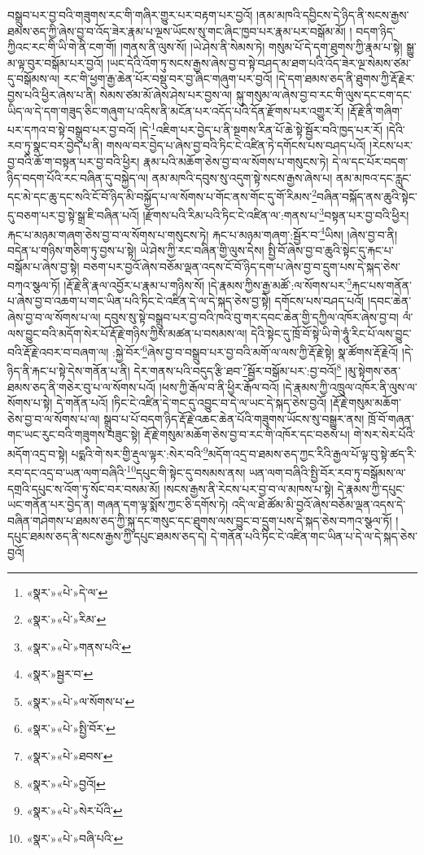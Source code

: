 བསྒྲུབ་པར་བྱ་བའི་གཟུགས་རང་གི་གཞིར་གྱུར་པར་བརྟག་པར་བྱའོ། །ནམ་མཁའི་དབྱིངས་དེ་ཉིད་ནི་སངས་རྒྱས་ཐམས་ཅད་ཀྱི་ཞེས་བྱ་བ་འོད་ཟེར་རྣམ་པ་ལྔས་ཡོངས་སུ་གང་ཞིང་ཁྱབ་པར་རྣམ་པར་བསྒོམ་མོ། །
བདག་ཉིད་ཀྱིའང་རང་གི་ཡི་གེ་ནི་ངག་གོ། །གནས་ནི་ལུས་སོ། །ཡེ་ཤེས་ནི་སེམས་ཏེ། གསུམ་པོ་དེ་དག་ཐུགས་ཀྱི་རྣམ་པ་སྟེ། སྒྱུ་མ་ལྟ་བུར་བསྒོམ་པར་བྱའོ། །ཡང་དེའི་འོག་ཏུ་སངས་རྒྱས་ཞེས་བྱ་བ་སྟེ་བཤད་མ་ཐག་པའི་འོད་ཟེར་ལྔ་སེམས་ཙམ་དུ་བསྒོམས་ལ། རང་གི་ཕྱག་རྒྱ་ཆེན་པོར་བསྡུ་བར་བྱ་ཞིང་གཞུག་པར་བྱའོ། །དེ་དག་ཐམས་ཅད་ནི་ཐུགས་ཀྱི་རྡོ་རྗེར་བྱས་པའི་ཕྱིར་ཞེས་པ་ནི། སེམས་ཙམ་མོ་ཞེས་ཤེས་པར་བྱས་ལ། སྐུ་གསུམ་ལ་ཞེས་བྱ་བ་རང་གི་ལུས་དང་ངག་དང་ཡིད་ལ་དེ་དག་གཟུད་ཅིང་གཞུག་པ་འདིས་ནི་མངོན་པར་འདོད་པའི་དོན་རྫོགས་པར་འགྱུར་རོ། །རྡོ་རྗེ་ནི་གཞིག་པར་དཀའ་བ་སྟེ་བསྒྲུབ་པར་བྱ་བའོ། །དེ་\footnote{«སྣར་»«པེ་»དེ་ལ་}འཇིག་པར་བྱེད་པ་ནི་སྔགས་རིན་པོ་ཆེ་སྟེ་སྦྱོར་བའི་ཁྱད་པར་རོ། །དེའི་རབ་ཏུ་སྣང་བར་བྱེད་པ་ནི། གསལ་བར་བྱེད་པ་ཞེས་བྱ་བའི་ཏིང་ངེ་འཛིན་ཏེ་དགོངས་པས་བཤད་པའོ། །རེངས་པར་བྱ་བའི་ཆོ་ག་བསྟན་པར་བྱ་བའི་ཕྱིར། རྣམ་པའི་མཆོག་ཅེས་བྱ་བ་ལ་སོགས་པ་གསུངས་ཏེ། དེ་ལ་དང་པོར་བདག་ཉིད་བདག་པོའི་རང་བཞིན་དུ་བསྐྱེད་ལ། ནམ་མཁའི་དབུས་སུ་འདུག་སྟེ་སངས་རྒྱས་ཞེས་པ། ནམ་མཁའ་དང་རླུང་དང་མེ་དང་ཆུ་དང་སའི་ངོ་བོ་ཉིད་མི་བསྐྱོད་པ་ལ་སོགས་པ་གོང་ནས་གོང་དུ་གོ་རིམས་\footnote{«སྣར་»«པེ་»རིམ་}བཞིན་བསྐོད་ནས་ཆུའི་སྟེང་དུ་བཅག་པར་བྱ་སྟེ་སྒྲ་ཇི་བཞིན་པའོ། །རྫོགས་པའི་རིམ་པའི་ཏིང་ངེ་འཛིན་ལ་:གནས་པ་\footnote{«སྣར་»«པེ་»གནས་པའི་}བསྟན་པར་བྱ་བའི་ཕྱིར། རྐང་པ་མཉམ་གཞག་ཅེས་བྱ་བ་ལ་སོགས་པ་གསུངས་ཏེ། རྐང་པ་མཉམ་གཞག་:སྦྱོར་བ་\footnote{«སྣར་»སྦྱར་བ་}ཡིས། །ཞེས་བྱ་བ་ནི། བདེན་པ་གཉིས་གཅིག་ཏུ་བྱས་པ་སྟེ། ཡེ་ཤེས་ཀྱི་རང་བཞིན་གྱི་ལུས་དེས། སྤྱི་བོ་ཞེས་བྱ་བ་ཆུའི་སྟེང་དུ་རྐང་པ་བསྒོམ་པ་ཞེས་བྱ་སྟེ། བཅག་པར་བྱའོ་ཞེས་བཅོམ་ལྡན་འདས་ངོ་བོ་ཉིད་དག་པ་ཞེས་བྱ་བ་དྲུག་པས་དེ་སྐད་ཅེས་བཀའ་སྩལ་ཏོ། །རྡོ་རྗེ་ནི་རྣལ་འབྱོར་པ་རྣམ་པ་གཉིས་སོ། །དེ་རྣམས་ཀྱིས་རྒྱ་མཚོ་:ལ་སོགས་པར་\footnote{«སྣར་»«པེ་»ལ་སོགས་པ་}རྐང་པས་གནོན་པ་ཞེས་བྱ་བ་འཆག་པ་གང་ཡིན་པའི་ཏིང་ངེ་འཛིན་དེ་ལ་དེ་སྐད་ཅེས་བྱ་སྟེ། དགོངས་པས་བཤད་པའོ། །དབང་ཆེན་ཞེས་བྱ་བ་ལ་སོགས་པ་ལ། དབུས་སུ་སྟེ་བསྒྲུབ་པར་བྱ་བའི་ཁའི་བུ་གར་དབང་ཆེན་གྱི་དཀྱིལ་འཁོར་ཞེས་བྱ་བ། ལཾ་ལས་བྱུང་བའི་མདོག་སེར་པོ་རྡོ་རྗེ་གཉིས་ཀྱིས་མཚན་པ་བསམས་ལ། དེའི་སྟེང་དུ་ཁྲོ་བོ་སྟེ་ཡི་གེ་ཧཱུཾ་རིང་པོ་ལས་བྱུང་བའི་རྡོ་རྗེ་འབར་བ་བཞག་ལ། :སྐྱེ་བོར་\footnote{«སྣར་»«པེ་»སྤྱི་བོར་}ཞེས་བྱ་བ་བསྒྲུབ་པར་བྱ་བའི་མགོ་ལ་ལས་ཀྱི་རྡོ་རྗེ་སྟེ། སྣ་ཚོགས་རྡོ་རྗེའོ། །དེ་ཉིད་ནི་རྐང་པ་སྟེ་དེས་གནོན་པ་ནི། དེར་གནས་པའི་བདུད་རྩི་ཐབ་\footnote{«སྣར་»«པེ་»ཐབས་}སྦྱོར་བསྒོམ་པར་:བྱ་བའོ།\footnote{«སྣར་»«པེ་»བྱའོ།} །མུ་སྟེགས་ཅན་ཐམས་ཅད་ནི་གཅེར་བུ་པ་ལ་སོགས་པའོ། །ཕས་ཀྱི་རྒོལ་བ་ནི་ཕྱིར་རྒོལ་བའོ། །དེ་རྣམས་ཀྱི་འཁྲུལ་འཁོར་ནི་ལུས་ལ་སོགས་པ་སྟེ། དེ་གནོན་པའོ། །ཏིང་ངེ་འཛིན་དེ་གང་དུ་འབྱུང་བ་དེ་ལ་ཡང་དེ་སྐད་ཅེས་བྱའོ། །རྡོ་རྗེ་གསུམ་མཆོག་ཅེས་བྱ་བ་ལ་སོགས་པ་ལ། སྒྲུབ་པ་པོ་བདག་ཉིད་རྡོ་རྗེ་འཆང་ཆེན་པོའི་གཟུགས་ཡོངས་སུ་བསྒྱུར་ནས། ཁྲོ་བོ་གཞན་གང་ཡང་རུང་བའི་གཟུགས་བཟུང་སྟེ། རྡོ་རྗེ་གསུམ་མཆོག་ཅེས་བྱ་བ་རང་གི་འཁོར་དང་བཅས་པ། གེ་སར་སེར་པོའི་མདོག་འདྲ་བ་སྟེ། པདྨའི་གེ་སར་གྱི་རྡུལ་ལྟར་:སེར་བའི་\footnote{«སྣར་»«པེ་»སེར་པོའི་}མདོག་འདྲ་བ་ཐམས་ཅད་ཀྱང་རིའི་རྒྱལ་པོ་ལྟ་བུ་སྟེ་ཚད་རི་རབ་དང་འདྲ་བ་ཡན་ལག་བཞིའི་\footnote{«སྣར་»«པེ་»བཞི་པའི་}དཔུང་གི་སྟེང་དུ་བསམས་ནས། ཡན་ལག་བཞིའི་སྤྱི་བོར་རབ་ཏུ་བསྒོམས་ལ་དགྲའི་དཔུང་ས་འོག་ཏུ་སོང་བར་བསམ་མོ། །སངས་རྒྱས་ནི་རེངས་པར་བྱ་བ་ལ་མཁས་པ་སྟེ། དེ་རྣམས་ཀྱི་དཔུང་ཡང་གནོན་པར་བྱེད་ན། གཞན་དག་ལྟ་སྨོས་ཀྱང་ཅི་དགོས་ཏེ། འདི་ལ་ཐེ་ཚོམ་མི་བྱའོ་ཞེས་བཅོམ་ལྡན་འདས་དེ་བཞིན་གཤེགས་པ་ཐམས་ཅད་ཀྱི་སྐུ་དང་གསུང་དང་ཐུགས་ལས་བྱུང་བ་དྲུག་པས་དེ་སྐད་ཅེས་བཀའ་སྩལ་ཏོ། །དཔུང་ཐམས་ཅད་ནི་སངས་རྒྱས་ཀྱི་དཔུང་ཐམས་ཅད་དེ། དེ་གནོན་པའི་ཏིང་ངེ་འཛིན་གང་ཡིན་པ་དེ་ལ་དེ་སྐད་ཅེས་བྱའོ། 